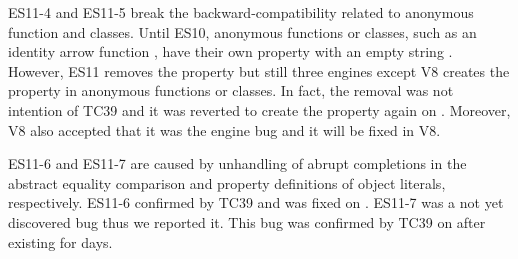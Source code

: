 ES11-4 and ES11-5 break the backward-compatibility related to anonymous function
and classes.  Until ES10, anonymous functions or classes, such as an identity
arrow function , have their own property  with an empty
string .  However, ES11 removes the  property but still
three engines except V8 creates the  property in anonymous
functions or classes.  In fact, the removal was not intention of TC39 and it was
reverted to create the property again on \inred{-}.  Moreover, V8 also accepted
that it was the engine bug and it will be fixed in V8.

ES11-6 and ES11-7 are caused by unhandling of abrupt completions in the abstract
equality comparison and property definitions of object literals, respectively.
ES11-6 confirmed by TC39 and was fixed on \inred{-}.  ES11-7 was a not yet
discovered bug thus we reported it.  This bug was confirmed by TC39 on \inred{-}
after existing for \inred{-} days.
